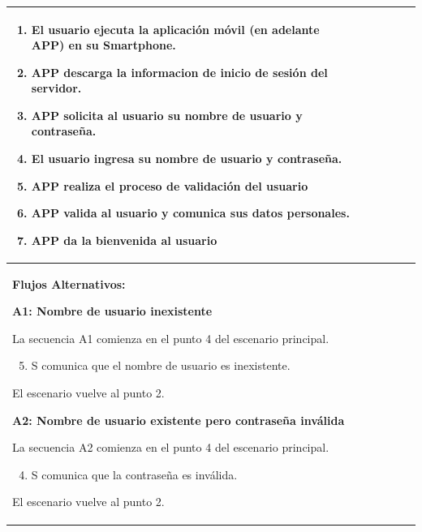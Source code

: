 \begin{longtable}{|l|p{5.5cm}|l|p{2cm}|l|p{1.9cm}|}
{				\begin{enumerate}
					\item El usuario ejecuta la aplicación móvil (en adelante APP) en su Smartphone.
					\item APP descarga la informacion de inicio de sesión del servidor.
					\item APP solicita al usuario su nombre de usuario y contraseña.
					\item El usuario ingresa su nombre de usuario y contraseña.
					\item APP realiza el proceso de validación del usuario
					\item APP valida al usuario y comunica sus datos personales.
					\item APP da la bienvenida al usuario
				\end{enumerate}

				} \\ \hline

				\multicolumn{6}{|p{15cm}|}{ \textbf{Flujos Alternativos: }

				\textbf{A1: Nombre de usuario inexistente}
				
				La secuencia A1 comienza en el punto 4 del escenario principal.
				\begin{enumerate}
						\setcounter{enumi}{4}
						\item S comunica que el nombre de usuario es inexistente.
				\end{enumerate}

				El escenario vuelve al punto 2.

				\textbf{A2: Nombre de usuario existente pero contraseña inválida}
				
				La secuencia A2 comienza en el punto 4 del escenario principal.
				\begin{enumerate}
						\setcounter{enumi}{3}
						\item S comunica que la contraseña es inválida.
				\end{enumerate}

				El escenario vuelve al punto 2.

				} \\ \hline
			\end{longtable}

